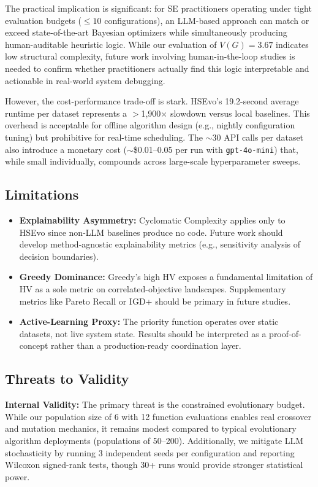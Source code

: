 \documentclass[sigconf,nonacm]{acmart}
\begin{document}
The practical implication is significant: for SE practitioners operating under tight evaluation budgets ($\leq 10$ configurations), an LLM-based approach can match or exceed state-of-the-art Bayesian optimizers while simultaneously producing human-auditable heuristic logic. While our evaluation of $V(G) = 3.67$ indicates low structural complexity, future work involving human-in-the-loop studies is needed to confirm whether practitioners actually find this logic interpretable and actionable in real-world system debugging.

However, the cost-performance trade-off is stark. HSEvo's 19.2-second average runtime per dataset represents a $>$1,900$\times$ slowdown versus local baselines. This overhead is acceptable for offline algorithm design (e.g., nightly configuration tuning) but prohibitive for real-time scheduling. The $\sim$30 API calls per dataset also introduce a monetary cost ($\sim$\$0.01--0.05 per run with \texttt{gpt-4o-mini}) that, while small individually, compounds across large-scale hyperparameter sweeps.

\subsection{Limitations}
\begin{itemize}
\item \textbf{Explainability Asymmetry:} Cyclomatic Complexity applies only to HSEvo since non-LLM baselines produce no code. Future work should develop method-agnostic explainability metrics (e.g., sensitivity analysis of decision boundaries).
\item \textbf{Greedy Dominance:} Greedy's high HV exposes a fundamental limitation of HV as a sole metric on correlated-objective landscapes. Supplementary metrics like Pareto Recall or IGD+ should be primary in future studies.
\item \textbf{Active-Learning Proxy:} The priority function operates over static datasets, not live system state. Results should be interpreted as a proof-of-concept rather than a production-ready coordination layer.
\end{itemize}

\subsection{Threats to Validity}

\textbf{Internal Validity:} The primary threat is the constrained evolutionary budget. While our population size of 6 with 12 function evaluations enables real crossover and mutation mechanics, it remains modest compared to typical evolutionary algorithm deployments (populations of 50--200). Additionally, we mitigate LLM stochasticity by running 3 independent seeds per configuration and reporting Wilcoxon signed-rank tests, though 30+ runs would provide stronger statistical power.
\end{document}
